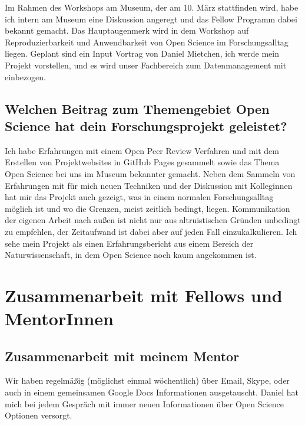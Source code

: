 \documentclass[11pt,a4paper]{article}
\begin{document}
Im Rahmen des Workshops am Museum, der am 10. März stattfinden wird, habe ich intern am Museum eine Diskussion angeregt und das Fellow Programm dabei bekannt gemacht. Das Hauptaugenmerk wird in dem Workshop auf Reproduzierbarkeit und Anwendbarkeit von Open Science im Forschungsalltag liegen. Geplant sind ein Input Vortrag von Daniel Mietchen, ich werde mein Projekt vorstellen, und es wird unser Fachbereich zum Datenmanagement mit einbezogen.


\subsection{Welchen Beitrag zum Themengebiet Open Science hat dein Forschungsprojekt geleistet?}%
Ich habe Erfahrungen mit einem Open Peer Review Verfahren und mit dem Erstellen von Projektwebsites in GitHub Pages gesammelt sowie das Thema Open Science bei uns im Museum bekannter gemacht. Neben dem Sammeln von Erfahrungen mit für mich neuen Techniken und der Diskussion mit Kolleginnen hat mir das Projekt auch gezeigt, was in einem normalen Forschungsalltag möglich ist und wo die Grenzen, meist zeitlich bedingt, liegen. Kommunikation der eigenen Arbeit nach außen ist nicht nur aus altruistischen Gründen unbedingt zu empfehlen, der Zeitaufwand ist dabei aber auf jeden Fall einzukalkulieren. Ich sehe mein Projekt als einen Erfahrungsbericht aus einem Bereich der Naturwissenschaft, in dem Open Science noch kaum angekommen ist.



\section{Zusammenarbeit mit Fellows und MentorInnen}%
\subsection{Zusammenarbeit mit meinem Mentor}%
Wir haben regelmäßig (möglichst einmal wöchentlich) über Email, Skype, oder auch in einem gemeinsamen Google Docs Informationen ausgetauscht. Daniel hat mich bei jedem Gespräch mit immer neuen Informationen über Open Science Optionen versorgt.
\end{document}
